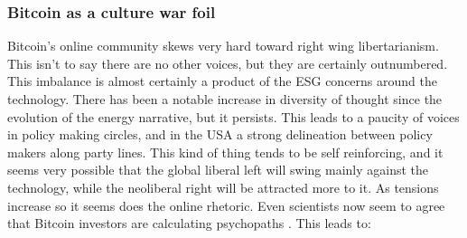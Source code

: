 \subsubsection{Bitcoin as a culture war foil}
Bitcoin's online community skews very hard toward right wing libertarianism. This isn't to say there are no other voices, but they are certainly outnumbered. This imbalance is almost certainly a product of the ESG concerns around the technology. There has been a notable increase in diversity of thought since the evolution of the energy narrative, but it persists. This leads to a paucity of voices in policy making circles, and in the USA a strong delineation between policy makers along party lines. This kind of thing tends to be self reinforcing, and it seems very possible that the global liberal left will swing mainly against the technology, while the neoliberal right will be attracted more to it. As tensions increase so it seems does the online rhetoric. Even scientists now seem to agree that Bitcoin investors are calculating psychopaths \cite{martin2022dark}. This leads to:
